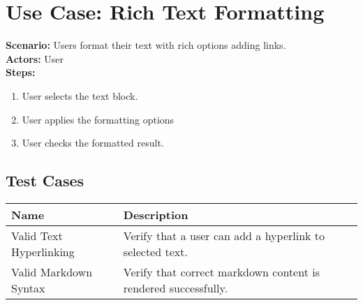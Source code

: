 \documentclass{article}
\begin{document}
    \section{\textbf{Use Case: Rich Text Formatting}}
\textbf{Scenario:} Users format their text with rich options adding links.\\
\textbf{Actors:} User\\
\textbf{Steps:}
\begin{enumerate}
\item User selects the text block.
\item User applies the formatting options
\item User checks the formatted result.
\end{enumerate}
\subsection{Test Cases}

        \begin{longtable}{|p{}|p{}|}
        \hline
        \textbf{Name} & \textbf{Description} \\
        \hline
        Valid Text Hyperlinking & Verify that a user can add a hyperlink to selected text. \\
\hline
Valid Markdown Syntax & Verify that correct markdown content is rendered successfully. \\
\hline
\end{longtable}
\end{document}
